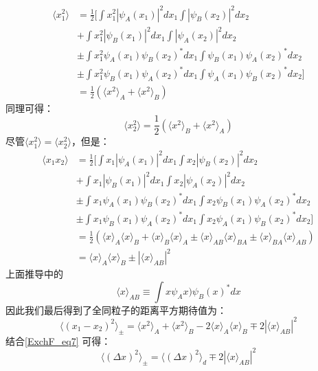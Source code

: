 \begin{align}
\langle x_1^2\rangle &= \frac{1}{2}\big[\int x_1^2|\psi_A(x_1)|^2dx_1\int |\psi_B(x_2)|^2dx_2\\
&+\int x_1^2|\psi_B(x_1)|^2dx_1\int |\psi_A(x_2)|^2dx_2\\ 
&\pm\int x_1^2\psi_A(x_1)\psi_B(x_2)^*dx_1\int \psi_B(x_1)\psi_A(x_2)^*dx_2\\
&\pm\int x_1^2\psi_B(x_1)\psi_A(x_2)^*dx_1\int \psi_A(x_1)\psi_B(x_2)^*dx_2\big]\\
&=\frac{1}{2}(\langle x^2\rangle_A+\langle x^2\rangle_B)
\end{align}
同理可得：
\begin{equation}
\langle x_2^2\rangle=\frac{1}{2}(\langle x^2\rangle_B+\langle x^2\rangle_A)
\end{equation}
尽管$\langle x_1^2\rangle=\langle x_2^2\rangle$，但是：
\begin{align}
\langle x_1x_2\rangle &= \frac{1}{2}\big[\int x_1|\psi_A(x_1)|^2dx_1\int x_2 |\psi_B(x_2)|^2dx_2\\
&+\int x_1|\psi_B(x_1)|^2dx_1\int x_2|\psi_A(x_2)|^2dx_2\\ 
&\pm\int x_1\psi_A(x_1)\psi_B(x_2)^*dx_1\int x_2\psi_B(x_1)\psi_A(x_2)^*dx_2\\
&\pm\int x_1\psi_B(x_1)\psi_A(x_2)^*dx_1\int x_2\psi_A(x_1)\psi_B(x_2)^*dx_2\big]\\
&=\frac{1}{2}\left(\langle x\rangle_A\langle x\rangle_B+\langle x\rangle_B\langle x\rangle_A\pm\langle x\rangle_{AB}\langle x\rangle_{BA}\pm\langle x\rangle_{BA}\langle x\rangle_{AB}\right)\\
&=\langle x\rangle_A\langle x\rangle_B\pm|\langle x\rangle_{AB}|^2
\end{align}
上面推导中的\begin{equation}
\langle x\rangle_{AB}\equiv \int x\psi_Ax)\psi_B(x)^*dx
\end{equation}
因此我们最后得到了全同粒子的距离平方期待值为：
\begin{equation}
\langle (x_1-x_2)^2\rangle_\pm=\langle x^2\rangle_A+\langle x^2\rangle_B-2\langle x\rangle_A\langle x\rangle_B\mp 2|\langle x\rangle_{AB}|^2
\end{equation}
结合\autoref{ExchF_eq7} 可得：
\begin{equation}
\langle (\Delta x)^2\rangle_\pm=\langle (\Delta x)^2\rangle_d\mp 2|\langle x\rangle_{AB}|^2
\end{equation}
